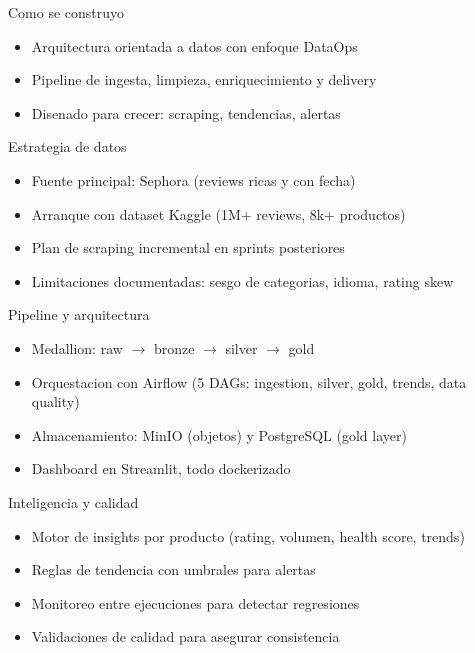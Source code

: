 \documentclass[aspectratio=169]{beamer}
\begin{document}
\begin{frame}{Como se construyo}
  \begin{itemize}
    \item Arquitectura orientada a datos con enfoque DataOps
    \item Pipeline de ingesta, limpieza, enriquecimiento y delivery
    \item Disenado para crecer: scraping, tendencias, alertas
  \end{itemize}
\end{frame}

\begin{frame}{Estrategia de datos}
  \begin{itemize}
    \item Fuente principal: Sephora (reviews ricas y con fecha)
    \item Arranque con dataset Kaggle (1M+ reviews, 8k+ productos)
    \item Plan de scraping incremental en sprints posteriores
    \item Limitaciones documentadas: sesgo de categorias, idioma, rating skew
  \end{itemize}
\end{frame}

\begin{frame}{Pipeline y arquitectura}
  \begin{itemize}
    \item Medallion: raw $\rightarrow$ bronze $\rightarrow$ silver $\rightarrow$ gold
    \item Orquestacion con Airflow (5 DAGs: ingestion, silver, gold, trends, data quality)
    \item Almacenamiento: MinIO (objetos) y PostgreSQL (gold layer)
    \item Dashboard en Streamlit, todo dockerizado
  \end{itemize}
\end{frame}

\begin{frame}{Inteligencia y calidad}
  \begin{itemize}
    \item Motor de insights por producto (rating, volumen, health score, trends)
    \item Reglas de tendencia con umbrales para alertas
    \item Monitoreo entre ejecuciones para detectar regresiones
    \item Validaciones de calidad para asegurar consistencia
  \end{itemize}
\end{frame}
\end{document}

